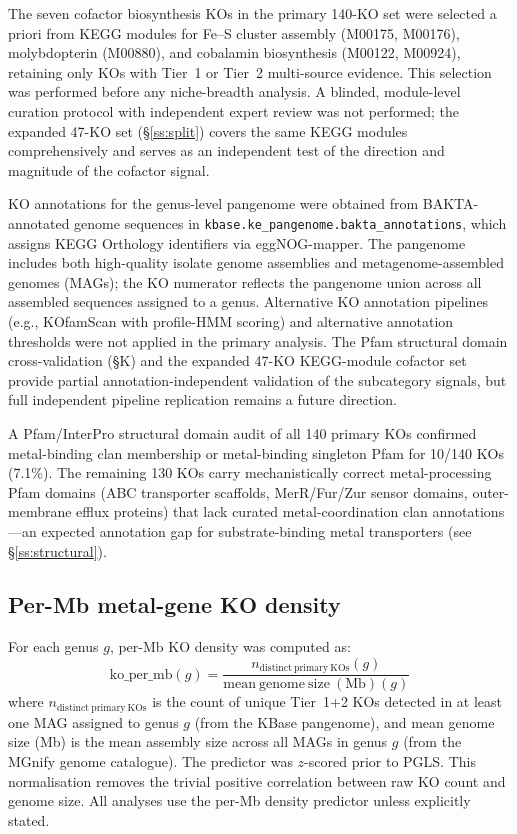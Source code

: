 \documentclass[times]{zHenriquesLab-StyleBioRxiv}
\begin{document}
The seven cofactor biosynthesis KOs in the primary 140-KO set were selected
a priori from KEGG modules for Fe--S cluster assembly (M00175, M00176),
molybdopterin (M00880), and cobalamin biosynthesis (M00122, M00924), retaining
only KOs with Tier~1 or Tier~2 multi-source evidence. This selection was
performed before any niche-breadth analysis. A blinded, module-level curation
protocol with independent expert review was not performed; the expanded 47-KO
set (\S\ref{ss:split}) covers the same KEGG modules comprehensively and serves
as an independent test of the direction and magnitude of the cofactor signal.

KO annotations for the genus-level pangenome were obtained from
BAKTA-annotated genome sequences in \texttt{kbase.ke\_pangenome.bakta\_annotations},
which assigns KEGG Orthology identifiers via eggNOG-mapper. The pangenome
includes both high-quality isolate genome assemblies and
metagenome-assembled genomes (MAGs); the KO numerator reflects the pangenome
union across all assembled sequences assigned to a genus. Alternative KO
annotation pipelines (e.g., KOfamScan with profile-HMM scoring) and
alternative annotation thresholds were not applied in the primary analysis.
The Pfam structural domain cross-validation (\S{}K) and the expanded 47-KO
KEGG-module cofactor set provide partial annotation-independent validation
of the subcategory signals, but full independent pipeline replication remains
a future direction.

A Pfam/InterPro structural domain audit of all 140 primary KOs confirmed
metal-binding clan membership or metal-binding singleton Pfam for 10/140 KOs
(7.1\%). The remaining 130 KOs carry mechanistically correct metal-processing
Pfam domains (ABC transporter scaffolds, MerR/Fur/Zur sensor domains,
outer-membrane efflux proteins) that lack curated metal-coordination clan
annotations---an expected annotation gap for substrate-binding metal transporters
(see \S\ref{ss:structural}).

\subsection{Per-Mb metal-gene KO density}
\label{ss:permb}

For each genus $g$, per-Mb KO density was computed as:
\[
\mathrm{ko\_per\_mb}(g)
  = \frac{n_{\mathrm{distinct\ primary\ KOs}}(g)}
         {\mathrm{mean\ genome\ size\ (Mb)}(g)}
\]
where $n_{\mathrm{distinct\ primary\ KOs}}$ is the count of unique Tier~1+2
KOs detected in at least one MAG assigned to genus $g$ (from
the KBase pangenome), and mean genome size (Mb) is the mean assembly
size across all MAGs in genus $g$ (from the MGnify genome catalogue). The
predictor was $z$-scored prior to PGLS. This normalisation removes the trivial
positive correlation between raw KO count and genome size. All analyses use the
per-Mb density predictor unless explicitly stated.
\end{document}

